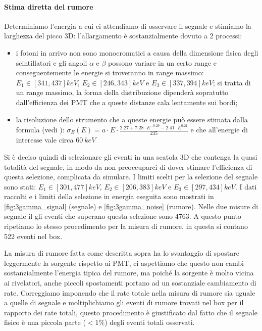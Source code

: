 \paragraph{Stima diretta del rumore}
Determiniamo l'energia a cui ci attendiamo di osservare il segnale e stimiamo la larghezza del picco 3D: l'allargamento è sostanzialmente dovuto a 2 processi:
\begin{itemize}
	\item i fotoni in arrivo non sono monocromatici a causa della dimensione fisica degli scintillatori e gli angoli $\alpha$ e $\beta$ possono variare in un certo range e conseguentemente le energie si troveranno in range massimo:  $E_1 \in [341,437]\si{keV}$, $E_2 \in [246,343]\si{keV}$ e $E_3 \in [337,394]\si{keV}$; si tratta di un range massimo, la forma della distribuzione dipenderà sopratutto dall'efficienza dei PMT che a queste distanze cala lentamente sui bordi;
	\item la risoluzione dello strumento che a queste energie può essere stimata dalla formula (vedi \cite{6}):
	$\sigma_E(E) = a \cdot E \cdot \frac{2.27 + 7.28 \cdot E ^ {-0.29} - 2.41 \cdot E ^ {0.21}} {235}$ e che all'energie di interesse vale circa $\SI{60}{keV}$
\end{itemize}


Si è deciso quindi di selezionare gli eventi in una scatola 3D che contenga la quasi totalità del segnale, in modo da non preoccuparci di dover stimare l'efficienza di questa selezione, complicata da simulare. 
I limiti scelti per la selezione del segnale sono stati: $E_1 \in [301,477]\si{keV}$, $E_2 \in [206,383]\si{keV}$ e $E_3 \in [297,434]\si{keV}$.
I dati raccolti e i limiti della selezione in energia eseguita sono mostrati in \autoref{fig:3gamma_signal} (segnale) e \autoref{fig:3gamma_noise} (rumore).
Nelle due misure di segnale il gli eventi che superano questa selezione sono 4763. 
A questo punto ripetiamo lo stesso procedimento per la misura di rumore, in questa si contano 522 eventi nel box.

La misura di rumore fatta come descritta sopra ha lo svantaggio di spostare leggermente la sorgente rispetto ai PMT, ci aspettiamo che questo non cambi sostanzialmente l'energia tipica del rumore, ma poiché la sorgente è molto vicina ai rivelatori, anche piccoli spostamenti portano ad un sostanziale cambiamento di rate. Correggiamo imponendo che il rate totale nella misura di rumore sia uguale a quelle di segnale e moltiplichiamo gli eventi di rumore trovati nel box per il rapporto dei rate totali, questo procedimento è giustificato dal fatto che il segnale fisico è una piccola parte ($< 1\%$) degli eventi totali osservati.

